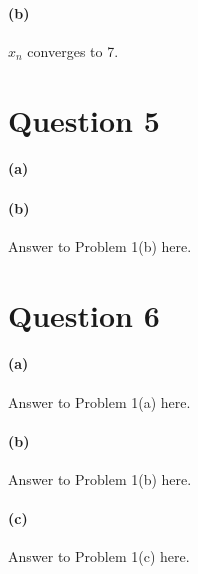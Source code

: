 \documentclass[10pt,letter]{article}
\begin{document}
\paragraph{(b)} $x_n$ converges to 7. 


\section*{Question 5}
\paragraph{(a)} 
\paragraph{(b)} Answer to Problem 1(b) here.


\section*{Question 6}
\paragraph{(a)} Answer to Problem 1(a) here.
\paragraph{(b)} Answer to Problem 1(b) here.
\paragraph{(c)} Answer to Problem 1(c) here.
\end{document}
